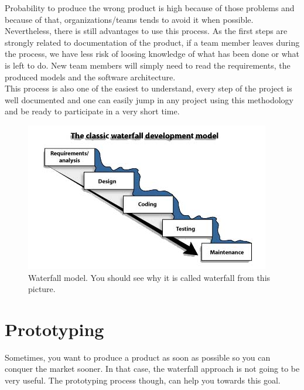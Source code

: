\documentclass[12pt]{article}
\theoremstyle{definition}
\theoremstyle{definition}
\theoremstyle{remark}
\begin{document}
Probability to produce the wrong product is high because of those problems and because of that, organizations/teams tends to avoid it when possible. Nevertheless, there is still advantages to use this process. As the first steps are strongly related to documentation of the product, if a team member leaves during the process, we have less risk of loosing knowledge of what has been done or what is left to do. New team members will simply need to read the requirements, the produced models and the software architecture.\\

This process is also one of the easiest to understand, every step of the project is well documented and one can easily jump in any project using this methodology and be ready to participate in a very short time.\\

\begin{figure}
    \centering
    \includegraphics[scale=0.8]{waterfall.jpg}
    \caption{Waterfall model. You should see why it is called waterfall from this picture.}
    \label{Waterfall}
\end{figure}



\section{Prototyping}


Sometimes, you want to produce a product as soon as possible so you can conquer the market sooner. In that case, the waterfall approach is not going to be very useful. The prototyping process though, can help you towards this goal.~\cite{Software_prototyping:2018}\\
\end{document}

